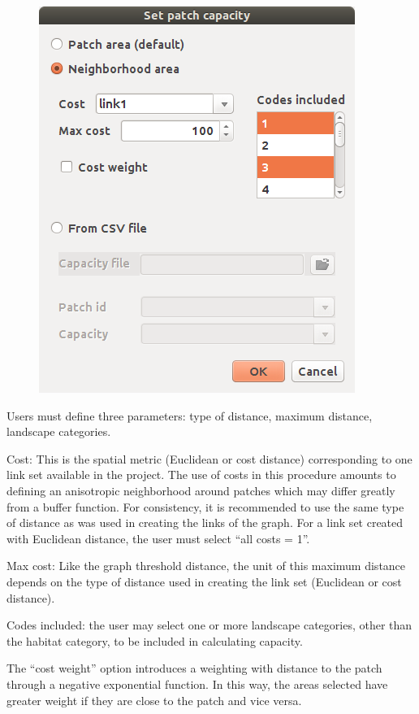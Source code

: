 \documentclass{article}
\begin{document}
\begin{figure}[H]
	\includegraphics[scale=0.5]{img/manual-en_img8.png}
\end{figure}

Users must define three parameters: type of distance, maximum distance, landscape categories.

Cost: This is the spatial metric (Euclidean or cost distance) corresponding to one link set available in the project. The use of costs in this procedure amounts to defining an anisotropic neighborhood around patches which may differ greatly from a buffer function. For consistency, it is recommended to use the same type of distance as was
used in creating the links of the graph. For a link set created with Euclidean distance, the user must select “all costs = 1”.

Max cost: Like the graph threshold distance, the unit of this maximum distance depends on the type of distance used in creating the link set (Euclidean or cost distance).

Codes included: the user may select one or more landscape categories, other than the habitat category, to be included in calculating capacity.

The “cost weight” option introduces a weighting with distance to the patch through a negative exponential function. In this way, the areas selected have greater weight if they are close to the patch and vice versa.
\end{document}
